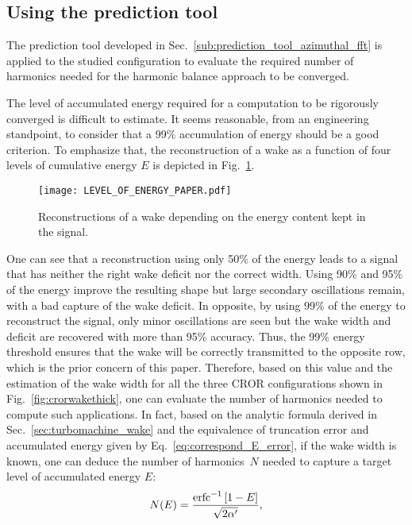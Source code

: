 
\subsection{Using the prediction tool}
\label{sub:dream_ls_conv_hb_prediction_tool}

The prediction tool developed in 
Sec.~\ref{sub:prediction_tool_azimuthal_fft} is applied
to the studied configuration to evaluate the
required number of harmonics needed for the
harmonic balance approach to be converged.

The level of accumulated energy required 
for a computation to be rigorously converged
is difficult to estimate. 
It seems reasonable, from an engineering standpoint, to consider
that a 99\% accumulation of energy should be a good criterion.
To emphasize that,
the reconstruction of a wake as a function of four levels of cumulative
energy $E$ is depicted in Fig.~\ref{fig:level_of_energy}. 
\begin{figure}[htp]
  \centering
  \texttt{[image: LEVEL\_OF\_ENERGY\_PAPER.pdf]}
  \caption{Reconstructions of a wake depending on
  the energy content kept in the signal.}
  \label{fig:level_of_energy}
\end{figure}
One can see
that a reconstruction using only 50\% of the energy
leads to a signal that has neither
the right wake deficit nor the correct width. Using
90\% and 95\% of the energy improve the resulting shape
but  large secondary
oscillations remain, with a bad capture
of the wake deficit.
In opposite, by using 99\% of the energy to reconstruct
the signal, only minor
oscillations are seen but 
the wake width and deficit are recovered with more than 
95\% accuracy.
Thus, the 99\% energy threshold ensures that the wake
will be correctly transmitted to the opposite row, which is
the prior concern of this paper.
Therefore, based on this value
and the estimation of the wake width
for all the three CROR configurations shown in Fig.~\ref{fig:crorwakethick},
one can evaluate the number of harmonics needed to compute such
applications.
In fact, based on the
analytic formula derived in Sec.~\ref{sec:turbomachine_wake}
and the equivalence of truncation error and accumulated energy given by
Eq.~\eqref{eq:correspond_E_error},
if the wake width is known, one can deduce the
number of harmonics~$N$ needed to capture a target level of accumulated energy
$E$:
\begin{equation}
    N(E) = \frac{\erfc^{-1} \left[1 - E \right]}{
    \sqrt{2 \alpha^\prime}},
    \label{eq:estimation_nb_harms}
\end{equation}
